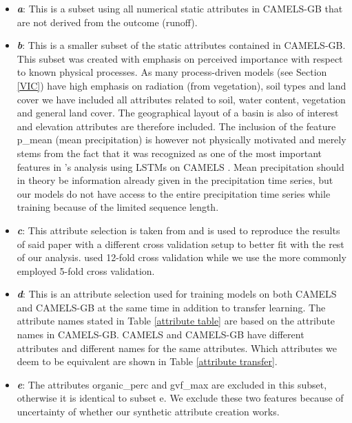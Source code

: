\begin{itemize}
    \item \textbf{\textit{a}}: This is a subset using all numerical static attributes in CAMELS-GB 
        \citep{CAMELS_GB} that are not derived from the outcome (runoff). 
    \item \textbf{\textit{b}}: This is a smaller subset of the static attributes contained in CAMELS-GB. 
        This subset was created with emphasis on perceived importance with respect 
        to known physical processes. As many process-driven models (see Section \ref{VIC}) have high 
        emphasis on radiation (from vegetation), soil types and land cover we have 
        included all attributes related to soil, water content, vegetation and general land cover. 
        The geographical layout of a basin is also of interest and elevation attributes 
        are therefore included. The inclusion of the feature p\_mean (mean precipitation)
        is however not 
        physically motivated and merely stems from the fact that it was recognized 
        as one of the most important features in \citet{lstm_second_paper}'s analysis 
        using LSTMs on CAMELS \citep{CAMELS_US}. Mean precipitation should in 
        theory be information already given in the precipitation time series, but 
        our models do not have access to the entire precipitation time series while 
        training because of the limited sequence length. 
    \item \textbf{\textit{c}}: This attribute selection is taken from \cite{lstm_third_paper} and 
        is used to reproduce the results of said paper with a different cross validation 
        setup to better fit with the rest of our analysis. \cite{lstm_third_paper} 
        used 12-fold cross validation while we use the more commonly employed 
        5-fold cross validation. 
    \item \textbf{\textit{d}}: This is an attribute selection used for training models on both 
        CAMELS and CAMELS-GB at the same time in addition to transfer learning. 
        The attribute names stated in Table \ref{attribute table} are based on the 
        attribute names in CAMELS-GB. CAMELS and CAMELS-GB have different attributes 
        and different names for the same attributes. Which attributes we deem to 
        be equivalent are shown in Table \ref{attribute transfer}.
    \item \textbf{\textit{e}}: The attributes organic\_perc and gvf\_max are excluded in this subset, 
        otherwise it is identical to subset e. We exclude these two features because 
        of uncertainty of whether our synthetic attribute creation works.
\end{itemize}

